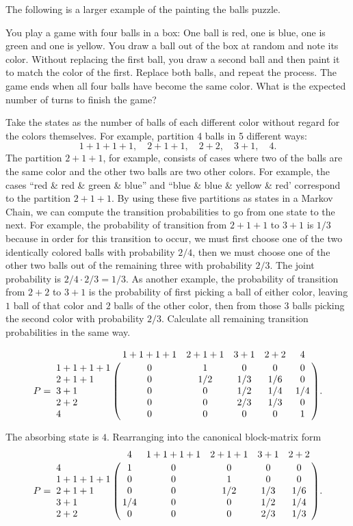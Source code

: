 \documentclass[12pt]{article}
\begin{document}
\begin{example}
    The following is a larger example of the painting the balls puzzle.

    You play a game with four balls in a box:  One ball is red, one is
    blue, one is green and one is yellow.  You draw a ball out of the
    box at random and note its color.  Without replacing the first ball,
    you draw a second ball and then paint it to match the color of the
    first.  Replace both balls, and repeat the process.  The game ends
    when all four balls have become the same color.  What is the
    expected number of turns to finish the game?

    Take the states as the number of balls of each different color
    without regard for the colors themselves.  For example, partition 4
    balls in 5 different ways:
    \[
        1+1+1+1, \quad 2+1+1, \quad 2+2, \quad 3+1, \quad 4.
    \] The partition \( 2+1+1 \), for example, consists of cases where
    two of the balls are the same color and the other two balls are two
    other colors.  For example, the cases ``red \& red \& green \&
    blue'' and ``blue \& blue \& yellow \& red' correspond to the
    partition \( 2+1+1 \).  By using these five partitions as states in
    a Markov Chain, we can compute the transition probabilities to go
    from one state to the next.  For example, the probability of
    transition from \( 2+1+1 \) to \( 3+1 \) is \( 1/3 \) because in
    order for this transition to occur, we must first choose one of the
    two identically colored balls with probability \( 2/4 \), then we
    must choose one of the other two balls out of the remaining three
    with probability \( 2/3 \).  The joint probability is \( 2/4 \cdot
    2/3 = 1/3 \).  As another example, the probability of transition
    from \( 2 + 2 \) to \( 3 + 1 \) is the probability of first picking
    a ball of either color, leaving \( 1 \) ball of that color and \( 2 \)
    balls of the other color, then from those \( 3 \) balls picking the
    second color with probability \( 2/3 \).  Calculate all remaining
    transition probabilities in the same way.

    \[
        P = \bordermatrix{ & 1+1+1+1 & 2+1+1 & 3 + 1 & 2 + 2 & 4 \cr
        1+1+1+1 & 0 & 1 & 0 & 0 & 0 \cr
        2+1+1 & 0 & 1/2 & 1/3 & 1/6 & 0 \cr
        3+1 & 0 & 0 & 1/2 & 1/4 & 1/4 \cr
        2+2 & 0 & 0 & 2/3 & 1/3 & 0 \cr
        4 & 0 & 0 & 0 & 0 & 1 \cr
        }.
    \]

    The absorbing state is \( 4 \).  Rearranging into the canonical
    block-matrix form
    \[
        P = \bordermatrix{ & 4 & 1+1+1+1 & 2+1+1 & 3 + 1 & 2 + 2 \cr
        4 & 1 & 0 & 0 & 0 & 0 \cr
        1+1+1+1 & 0 & 0 & 1 & 0 & 0 \cr
        2+1+1 & 0 & 0 & 1/2 & 1/3 & 1/6 \cr
        3+1 & 1/4 & 0 & 0 & 1/2 & 1/4 \cr
        2+2 & 0 & 0 & 0 & 2/3 & 1/3 \cr
        }.
    \]


\end{example}
\end{document}
